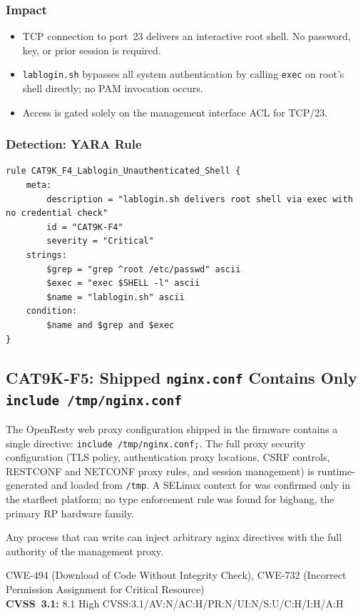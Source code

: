 \documentclass[11pt,a4paper]{article}
\begin{document}
\subsubsection{Impact}

\begin{itemize}[nosep]
  \item TCP connection to port~23 delivers an interactive root shell. No password,
    key, or prior session is required.
  \item \texttt{lablogin.sh} bypasses all system authentication by calling
    \texttt{exec} on root's shell directly; no PAM invocation occurs.
  \item Access is gated solely on the management interface ACL for TCP/23.
\end{itemize}

\subsubsection{Detection: YARA Rule}

\begin{lstlisting}[style=yara]
rule CAT9K_F4_Lablogin_Unauthenticated_Shell {
    meta:
        description = "lablogin.sh delivers root shell via exec with no credential check"
        id = "CAT9K-F4"
        severity = "Critical"
    strings:
        $grep = "grep ^root /etc/passwd" ascii
        $exec = "exec $SHELL -l" ascii
        $name = "lablogin.sh" ascii
    condition:
        $name and $grep and $exec
}
\end{lstlisting}

\subsection{CAT9K-F5: Shipped \texorpdfstring{\texttt{nginx.conf}}{nginx.conf} Contains Only \texttt{include /tmp/nginx.conf}}

\begin{overviewbox}
The OpenResty web proxy configuration shipped in the firmware contains a single
directive: \texttt{include /tmp/nginx.conf;}. The full proxy security configuration
(TLS policy, authentication proxy locations, CSRF controls, RESTCONF and NETCONF
proxy rules, and session management) is runtime-generated and loaded from
\texttt{/tmp}. A SELinux context for  was confirmed only in
the starfleet platform; no type enforcement rule was found for bigbang, the primary
RP hardware family.

Any process that can write  can inject arbitrary nginx
directives with the full authority of the management proxy.

CWE-494 (Download of Code Without Integrity Check), CWE-732 (Incorrect Permission Assignment for Critical Resource)\\
\textbf{CVSS~3.1:} 8.1 High \quad CVSS:3.1/AV:N/AC:H/PR:N/UI:N/S:U/C:H/I:H/A:H
\end{overviewbox}
\end{document}
